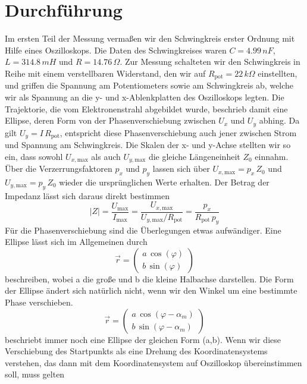 \documentclass[a4paper, 12pt,]{scrartcl}
\begin{document}
\section{Durchführung}
Im ersten Teil der Messung vermaßen wir den Schwingkreis erster Ordnung mit Hilfe eines Oszilloskops. Die Daten des Schwingkreises waren $C=4.99\,nF$, $L=314.8\,mH$ und $R=14.76\,\Omega$. Zur Messung schalteten wir den Schwingkreis in Reihe mit einem verstellbaren Widerstand, den wir auf $R_\text{pot}=22\,k\Omega$ einstellten, und griffen die Spannung am Potentiometers sowie am Schwingkreis ab, welche wir als Spannung an die y- und x-Ablenkplatten des Oszilloskops legten. Die Trajektorie, die vom Elektronenstrahl abgebildet wurde, beschrieb damit eine Ellipse, deren Form von der Phasenverschiebung zwischen $U_x$ und $U_y$ abhing. Da gilt $U_y=I\,R_\text{pot}$, entspricht diese Phasenverschiebung auch jener zwischen Strom und Spannung am Schwingkreis. Die Skalen der x- und y-Achse stellten wir so ein, dass sowohl $U_{x,\text{max}}$ als auch $U_{y,\text{max}}$ die gleiche Längeneinheit $Z_0$ einnahm. Über die Verzerrungsfaktoren $p_x$ und $p_y$ lassen sich über $U_{x,\text{max}}=p_x\,Z_0$ und $U_{y,\text{max}}=p_y\,Z_0$ wieder die ursprünglichen Werte erhalten. Der Betrag der Impedanz lässt sich daraus direkt bestimmen
\begin{equation*}|Z|=\frac{U_\text{max}}{I_\text{max}}=\frac{U_{x,\text{max}}}{U_{y,\text{max}}/R_\text{pot}}=\frac{p_x}{R_\text{pot}\,p_y}\end{equation*}
Für die Phasenverschiebung sind die Überlegungen etwas aufwändiger. Eine Ellipse lässt sich im Allgemeinen durch
\begin{equation*}\vec{r}=\left(\begin{array}{c}a\,\cos(\varphi)\\ b\,\sin(\varphi)\end{array}\right)\end{equation*}
beschreiben, wobei a die große und b die kleine Halbachse darstellen. Die Form der Ellipse ändert sich natürlich nicht, wenn wir den Winkel um eine bestimmte Phase verschieben.
\begin{equation*}\vec{r}=\left(\begin{array}{c}a\,\cos(\varphi-\alpha_m)\\ b\,\sin(\varphi-\alpha_m)\end{array}\right)\end{equation*}
beschriebt immer noch eine Ellipse der gleichen Form (a,b). Wenn wir diese Verschiebung des Startpunkts als eine Drehung des Koordinatensystems verstehen, das dann mit dem Koordinatensystem auf Oszilloskop übereinstimmen soll, muss gelten
\end{document}
